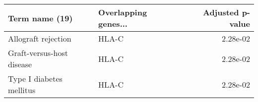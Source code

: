 \begin{tabular}{llr}
\toprule
           Term name (19) & Overlapping genes... &  Adjusted p-value \\
\midrule
      Allograft rejection &                HLA-C &          2.28e-02 \\
Graft-versus-host disease &                HLA-C &          2.28e-02 \\
 Type I diabetes mellitus &                HLA-C &          2.28e-02 \\
\bottomrule
\end{tabular}
